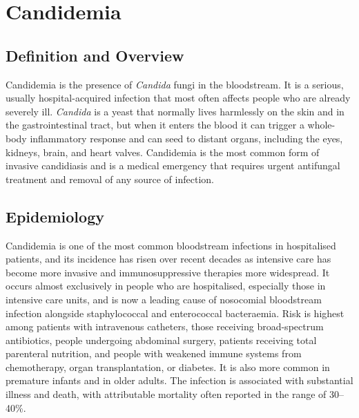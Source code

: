 \chapter{Candidemia}

\section*{Definition and Overview}
Candidemia is the presence of \textit{Candida} fungi in the bloodstream. It is a serious, usually hospital-acquired infection that most often affects people who are already severely ill. \textit{Candida} is a yeast that normally lives harmlessly on the skin and in the gastrointestinal tract, but when it enters the blood it can trigger a whole-body inflammatory response and can seed to distant organs, including the eyes, kidneys, brain, and heart valves. Candidemia is the most common form of invasive candidiasis and is a medical emergency that requires urgent antifungal treatment and removal of any source of infection.

\section*{Epidemiology}
Candidemia is one of the most common bloodstream infections in hospitalised patients, and its incidence has risen over recent decades as intensive care has become more invasive and immunosuppressive therapies more widespread. It occurs almost exclusively in people who are hospitalised, especially those in intensive care units, and is now a leading cause of nosocomial bloodstream infection alongside staphylococcal and enterococcal bacteraemia. Risk is highest among patients with intravenous catheters, those receiving broad-spectrum antibiotics, people undergoing abdominal surgery, patients receiving total parenteral nutrition, and people with weakened immune systems from chemotherapy, organ transplantation, or diabetes. It is also more common in premature infants and in older adults. The infection is associated with substantial illness and death, with attributable mortality often reported in the range of 30--40\%.

